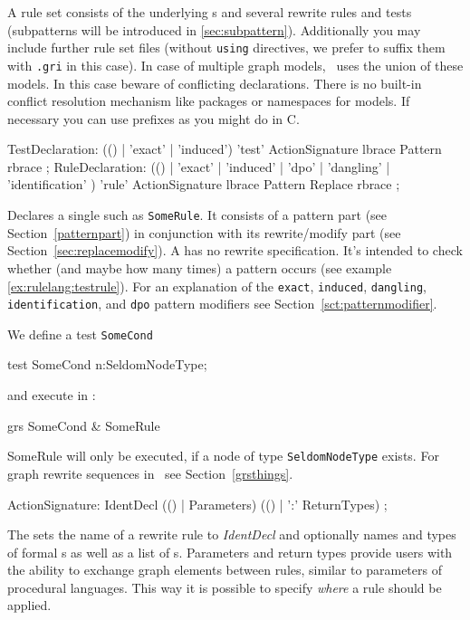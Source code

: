 A rule set consists of the underlying s and several rewrite rules and tests (subpatterns will be introduced in \ref{sec:subpattern}).
Additionally you may include further rule set files (without \texttt{using} directives, we prefer to suffix them with \texttt{.gri} in this case).
In case of multiple graph models, \GrG\ uses the union of these models. In this case beware of conflicting declarations.
There is no built-in conflict resolution mechanism like packages or namespaces for models.
If necessary you can use prefixes as you might do in C.

\begin{rail}
  TestDeclaration: (() | 'exact' | 'induced') 'test' ActionSignature lbrace Pattern rbrace ;
  RuleDeclaration: (() | 'exact' | 'induced' | 'dpo' | 'dangling' | 'identification' ) 'rule' ActionSignature lbrace Pattern Replace rbrace ;
\end{rail}
Declares a single  such as \texttt{SomeRule}. 
It consists of a pattern part (see Section~\ref{patternpart}) in conjunction with its rewrite/modify part (see Section~\ref{sec:replacemodify}). 
A  has no rewrite specification. 
It's intended to check whether (and maybe how many times) a pattern occurs (see example \ref{ex:rulelang:testrule}).
For an explanation of the \texttt{exact}, \texttt{induced}, \texttt{dangling}, \texttt{identification}, and \texttt{dpo} pattern modifiers see Section~\ref{sct:patternmodifier}. 
\begin{example}
\label{ex:rulelang:testrule}
We define a test \texttt{SomeCond}
\begin{grgen}
test SomeCond {
  n:SeldomNodeType;
}
\end{grgen}
and execute in \GrShell:
\begin{grshell}
  grs SomeCond & SomeRule
\end{grshell}
SomeRule will only be executed, if a node of type \texttt{SeldomNodeType} exists. 
For graph rewrite sequences in \GrShell\ see Section~\ref{grsthings}.
\end{example}

\begin{rail}  
  ActionSignature: IdentDecl (() | Parameters) (() | ':' ReturnTypes) ;
\end{rail}
The  sets the name of a rewrite rule to \emph{IdentDecl} and optionally names and types of formal s as well as a list of s.
Parameters and return types provide users with the ability to exchange graph elements between rules, similar to parameters of procedural languages.
This way it is possible to specify \emph{where} a rule should be applied.

